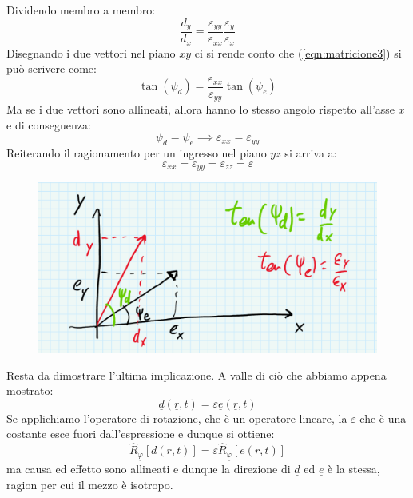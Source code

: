 \documentclass{book}
\begin{document}
            Dividendo membro a membro:
            \begin{equation}
            \label{eqn:matricione3}
                \frac{d_{y}}{d_{x}} = \frac{\varepsilon_{yy}}{\varepsilon_{xx}} \frac{\varepsilon_{y}}{\varepsilon_{x}}
            \end{equation}
            Disegnando i due vettori nel piano $xy$ ci si rende conto che (\ref{eqn:matricione3}) si può scrivere come:
            \begin{equation}
                \tan(\psi_{d}) = \frac{\varepsilon_{xx}}{\varepsilon_{yy}} \tan(\psi_{e})
            \end{equation}
            Ma se i due vettori sono allineati, allora hanno lo stesso angolo rispetto all'asse $x$ e di conseguenza:
            \begin{equation}
                \psi_{d} = \psi_{e} \implies \varepsilon_{xx} = \varepsilon_{yy}
            \end{equation}
            Reiterando il ragionamento per un ingresso nel piano $yz$ si arriva a:
            \begin{equation}
                \varepsilon_{xx} = \varepsilon_{yy} =\varepsilon_{zz} = \varepsilon
            \end{equation}
            \begin{figure}[h!]
                \centering
                \includegraphics[width=0.5\linewidth]{img//Chapter_one/chaptOneMatricione.png}
            \end{figure}
            Resta da dimostrare l'ultima implicazione. A valle di ciò che abbiamo appena mostrato:
            \begin{equation}
                \underline{d}(\underline{r},t) = \varepsilon \underline{e}(\underline{r},t)
            \end{equation}
            Se applichiamo l'operatore di rotazione, che è un operatore lineare, la $\varepsilon$ che è una costante esce fuori dall'espressione e dunque si ottiene:
            \begin{equation}
                \hat{R}_{\underline{\varphi}}[\underline{d}(\underline{r},t)] = \varepsilon \hat{R}_{\underline{\varphi}}[\underline{e}(\underline{r},t)]
            \end{equation}
            ma causa ed effetto sono allineati e dunque la direzione di $\underline{d}$ ed $\underline{e}$ è la stessa, ragion per cui il mezzo è isotropo.
\end{document}
